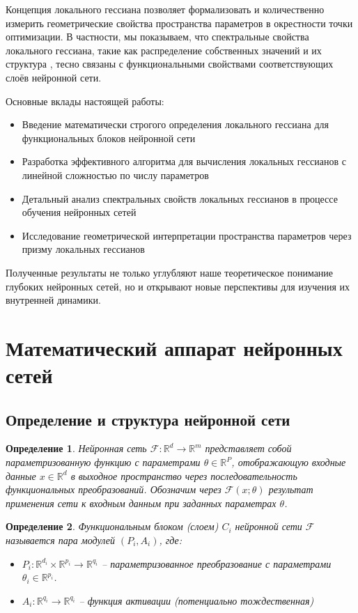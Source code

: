 \documentclass[a4paper,12pt]{article}
\newtheorem{definition}{Определение}
\begin{document}
Концепция локального гессиана позволяет формализовать и количественно измерить геометрические свойства
пространства параметров в окрестности точки оптимизации. В частности, мы показываем, что спектральные
свойства локального гессиана, такие как распределение собственных значений и их структура
\cite{ghorbani2019investigation}, тесно связаны с функциональными свойствами соответствующих слоёв нейронной сети.

Основные вклады настоящей работы:
\begin{itemize}
  \item Введение математически строгого определения локального гессиана для функциональных блоков нейронной сети
  \item Разработка эффективного алгоритма для вычисления локальных гессианов с линейной сложностью по числу параметров
  \item Детальный анализ спектральных свойств локальных гессианов в процессе обучения нейронных сетей
  \item Исследование геометрической интерпретации пространства параметров через призму локальных гессианов
\end{itemize}

Полученные результаты не только углубляют наше теоретическое понимание глубоких нейронных сетей, но и
открывают новые перспективы для изучения их внутренней динамики.

\section{Математический аппарат нейронных сетей}

\subsection{Определение и структура нейронной сети}

\begin{definition}
  Нейронная сеть $\mathcal{F}: \mathbb{R}^d \rightarrow \mathbb{R}^m$ представляет собой параметризованную
  функцию с параметрами $\theta \in \mathbb{R}^P$, отображающую входные данные $x \in \mathbb{R}^d$ в
  выходное пространство через последовательность функциональных преобразований. Обозначим через
  $\mathcal{F}(x; \theta)$ результат применения сети к входным данным при заданных параметрах $\theta$.
\end{definition}

\begin{definition}
  Функциональным блоком (слоем) $C_i$ нейронной сети $\mathcal{F}$ называется пара модулей $(P_i, A_i)$, где:
  \begin{itemize}
    \item $P_i: \mathbb{R}^{d_i} \times \mathbb{R}^{p_i} \rightarrow \mathbb{R}^{q_i}$ -- параметризованное
      преобразование с параметрами $\theta_i \in \mathbb{R}^{p_i}$.
    \item $A_i: \mathbb{R}^{q_i} \rightarrow \mathbb{R}^{q_i}$ -- функция активации (потенциально тождественная)
  \end{itemize}
\end{definition}
\end{document}

